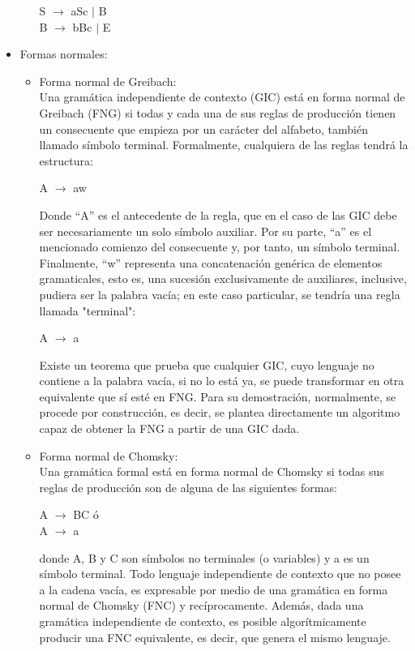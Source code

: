 \documentclass[12pt,a4paper,spanish]{book}
\begin{document}
\begin{itemize}
\begin{enumerate}
    S  $\rightarrow$ aSc $\mid$ B\\
    B $\rightarrow$ bBc $\mid$ E\\
\end{enumerate}
\item Formas normales:
\begin{itemize}
\item Forma normal de Greibach:\\
\newline
Una gram\'atica independiente de contexto (GIC) est\'a en forma normal de Greibach (FNG) si todas y cada una de sus reglas de producci\'on tienen un consecuente que empieza por un car\'acter del alfabeto, tambi\'en llamado s\'imbolo terminal. Formalmente, cualquiera de las reglas tendr\'a la estructura:\\
\begin{center}
A $\rightarrow$ aw
\end{center}
Donde ``A'' es el antecedente de la regla, que en el caso de las GIC debe ser necesariamente un solo s\'imbolo auxiliar. Por su parte, ``a'' es el mencionado comienzo del consecuente y, por tanto, un s\'imbolo terminal. Finalmente, ``w'' representa una concatenaci\'on gen\'erica de elementos gramaticales, esto es, una sucesi\'on exclusivamente de auxiliares, inclusive, pudiera ser la palabra vac\'ia; en este caso particular, se tendr\'ia una regla llamada "terminal":\\
\begin{center}
A $\rightarrow$ a
\end{center}
Existe un teorema que prueba que cualquier GIC, cuyo lenguaje no contiene a la palabra vac\'ia, si no lo est\'a ya, se puede transformar en otra equivalente que s\'i est\'e en FNG. Para su demostraci\'on, normalmente, se procede por construcci\'on, es decir, se plantea directamente un algoritmo capaz de obtener la FNG a partir de una GIC dada.\\
\item Forma normal de Chomsky:\\
\newline
Una gram\'atica formal est\'a en forma normal de Chomsky si todas sus reglas de producci\'on son de alguna de las siguientes formas:
\begin{center}
A $\rightarrow$ BC \'o\\ 
A $\rightarrow$ a\\
\end{center}
donde A, B y C son s\'imbolos no terminales (o variables) y a es un s\'imbolo terminal.
Todo lenguaje independiente de contexto que no posee a la cadena vac\'ia, es expresable por medio de una gram\'atica en forma normal de Chomsky (FNC) y rec\'iprocamente. Adem\'as, dada una gram\'atica independiente de contexto, es posible algor\'itmicamente producir una FNC equivalente, es decir, que genera el mismo lenguaje.
\end{itemize}
\end{itemize}
\end{document}
